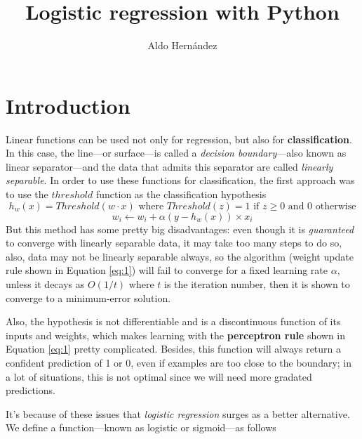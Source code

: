 \documentclass[10pt]{article}
\begin{document}
\begin{opening}
  \title{Logistic regression with Python}
  \author[Universidad Autónoma de Nuevo León, San Nicolás de los Garza, aldo.hernandezt@uanl.edu.mx]{Aldo Hernández}

  \begin{abstract}
  \end{abstract}

  \keywords{}
\end{opening}

\section{Introduction}
Linear functions can be used not only for regression, but also for \textbf{classification}. In this case, the line---or surface---is called a \textit{decision boundary}---also known as linear separator---and the data that admits this separator are called \textit{linearly separable}. \cite{ai} In order to use these functions for classification, the first approach was to use the $threshold$ function as the classification hypothesis
\begin{equation*}
  h_{w}(x) = Threshold(w \cdot x) \text{ where } Threshold(z) = 1 \text{ if } z \geq 0 \text{ and } 0 \text{ otherwise}
\end{equation*}
\begin{equation} \label{eq:1}
  w_{i} \leftarrow w_{i} + \alpha (y - h_{w}(x)) \times x_{i}
\end{equation}
But this method has some pretty big disadvantages: even though it is \textit{guaranteed} to converge with linearly separable data, it may take too many steps to do so, also, data may not be linearly separable always, so the algorithm (weight update rule shown in Equation \ref{eq:1}) will fail to converge for a fixed learning rate $\alpha$, unless it decays as $O(1/t)$ where $t$ is the iteration number, then it is shown to converge to a minimum-error solution. \cite{ai} \par
Also, the hypothesis is not differentiable and is a discontinuous function of its inputs and weights, which makes learning with the \textbf{perceptron rule} shown in Equation \ref{eq:1} pretty complicated. Besides, this function will always return a confident prediction of 1 or 0, even if examples are too close to the boundary; in a lot of situations, this is not optimal since we will need more gradated predictions. \cite{ai} \par
It's because of these issues that \textit{logistic regression} surges as a better alternative. We define a function---known as logistic or sigmoid---as follows
\end{document}
